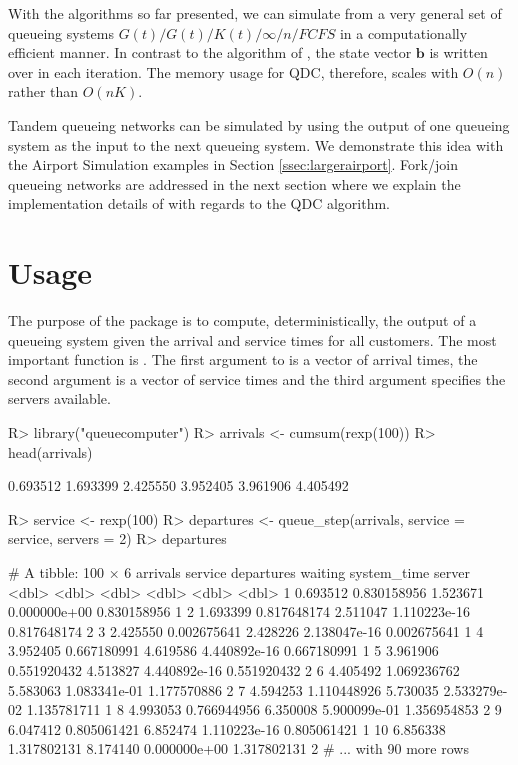 \documentclass[article]{jss}
\begin{document}
With the algorithms so far presented, we can simulate from a very general set of queueing systems $G(t)/G(t)/K(t)/\infty/n/FCFS$ in a computationally efficient manner. In contrast to the algorithm of \cite{kin_generalized_2010}, the state vector $\mathbf{b}$ is written over in each iteration. The memory usage for QDC, therefore, scales with $O(n)$ rather than $O(nK)$. 

Tandem queueing networks can be simulated by using the output of one queueing system as the input to the next queueing system. We demonstrate this idea with the Airport Simulation examples in Section \ref{ssec:largerairport}. Fork/join queueing networks are addressed in the next section where we explain the implementation details of  with regards to the QDC algorithm.  

\newpage

\section{Usage} \label{sec:usage}

The purpose of the package  is to compute, deterministically, the output of a queueing system given the arrival and service times for all customers. The most important function is . The first argument to   is a vector of arrival times, the second argument is a vector of service times and the third argument specifies the servers available. 

\begin{CodeChunk}
\begin{Sinput}
R> library("queuecomputer")
R> arrivals <- cumsum(rexp(100))
R> head(arrivals)
\end{Sinput}
\begin{Soutput}
[1] 0.693512 1.693399 2.425550 3.952405 3.961906 4.405492
\end{Soutput}
\begin{Sinput}
R> service <- rexp(100)
R> departures <- queue_step(arrivals, service = service, servers = 2)
R> departures
\end{Sinput}
\begin{Soutput}
# A tibble: 100 × 6
   arrivals     service departures      waiting system_time server
      <dbl>       <dbl>      <dbl>        <dbl>       <dbl>  <dbl>
1  0.693512 0.830158956   1.523671 0.000000e+00 0.830158956      1
2  1.693399 0.817648174   2.511047 1.110223e-16 0.817648174      2
3  2.425550 0.002675641   2.428226 2.138047e-16 0.002675641      1
4  3.952405 0.667180991   4.619586 4.440892e-16 0.667180991      1
5  3.961906 0.551920432   4.513827 4.440892e-16 0.551920432      2
6  4.405492 1.069236762   5.583063 1.083341e-01 1.177570886      2
7  4.594253 1.110448926   5.730035 2.533279e-02 1.135781711      1
8  4.993053 0.766944956   6.350008 5.900099e-01 1.356954853      2
9  6.047412 0.805061421   6.852474 1.110223e-16 0.805061421      1
10 6.856338 1.317802131   8.174140 0.000000e+00 1.317802131      2
# ... with 90 more rows
\end{Soutput}
\end{CodeChunk}
\end{document}
